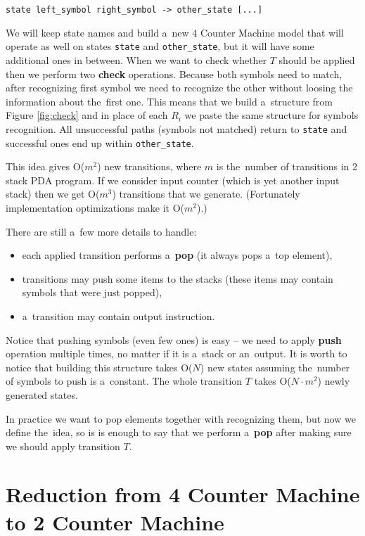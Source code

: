 \documentclass[english,shortabstract,mgr]{iithesis}
\begin{document}
\begin{verbatim}
state left_symbol right_symbol -> other_state [...]
\end{verbatim}

We will keep state names and build a~new 4 Counter Machine model that will operate as well
on states \texttt{state} and \texttt{other\_state}, but it will have some additional ones
in between. When we want to check whether $T$ should be applied then we perform two
\textbf{check} operations. Because both symbols need to match, after recognizing first symbol
we need to recognize the other without loosing the information about the~first one. This
means that we build a~structure from Figure \ref{fig:check} and in place of each $R_i$ we
paste the same structure for symbols recognition. All unsuccessful paths (symbols not matched)
return to \texttt{state} and successful ones end up within \texttt{other\_state}.

This idea gives O($m^2$) new transitions, where $m$ is the~number of transitions in 2 stack PDA
program. If we consider input counter (which is yet another input stack) then we get O($m^3$)
transitions that we generate. (Fortunately implementation optimizations make it O($m^2$).)

There are still a~few more details to handle:
\begin{itemize}
  \item each applied transition performs a~\textbf{pop} (it always pops a~top element),
  \item transitions may push some items to the stacks (these items may contain symbols that
      were just popped),
  \item a~transition may contain output instruction.
\end{itemize}

Notice that pushing symbols (even few ones) is easy -- we need to apply \textbf{push} operation
multiple times, no matter if it is a~stack or an~output. It is worth to notice
that building this structure takes O($N$) new states assuming the~number of symbols
to push is a~constant. The whole transition $T$ takes O($N \cdot m^2$) newly
generated states.

In practice we want to pop elements together with recognizing them, but now we define the~idea, so
is is enough to say that we perform a~\textbf{pop} after making sure we should apply transition $T$.

\section {Reduction from 4 Counter Machine to 2 Counter Machine}
\end{document}
